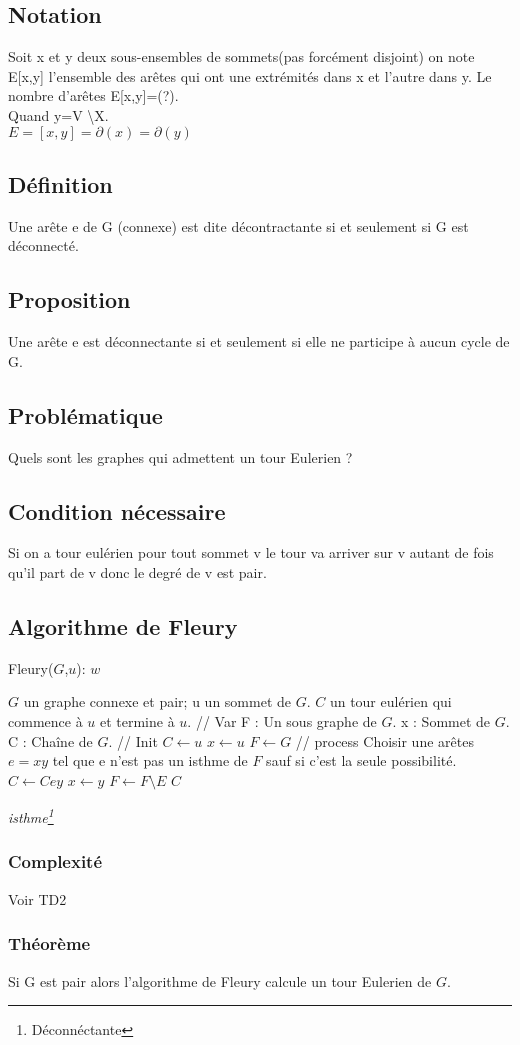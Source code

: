 \documentclass{article}
\begin{document}
\subsection*{Notation}
 Soit x et y deux sous-ensembles de sommets(pas forcément disjoint) on note E[x,y] l’ensemble des arêtes qui ont une extrémités dans x et l’autre dans y. Le nombre d’arêtes E[x,y]=(?). \\
Quand y=V \backslash X. \\
$E=[x,y]=\partial(x)=\partial(y)$ \\
\subsection*{Définition}
Une arête e de G (connexe) est dite décontractante si et seulement si G est déconnecté. 
\subsection*{Proposition}
Une arête e est déconnectante si et seulement si elle ne participe à aucun cycle de G.
\newpage
\subsection*{Problématique}
Quels sont les graphes qui admettent un tour Eulerien ?
\subsection*{Condition nécessaire}
Si on a tour eulérien pour tout sommet v le tour va arriver sur v autant de fois qu’il part de v donc le degré de v est pair. 
\subsection{Algorithme de Fleury}
\begin{algorithm}
\caption{Fleury($G$,$u$): $w$}
\begin{algorithmic}
\REQUIRE $G$ un graphe connexe et pair; u un sommet de $G$. 
\ENSURE $C$ un tour eulérien qui commence à $u$ et termine à $u$.
\STATE // Var
\STATE F : Un sous graphe de $G$. 
\STATE x : Sommet de $G$.
\STATE C : Chaîne de $G$.
\STATE // Init
\STATE $C \leftarrow u$
\STATE $x \leftarrow u$
\STATE $F \leftarrow G$
\STATE // process
\STATE Choisir une arêtes $e=xy$ tel que e n'est pas un isthme de $F$ sauf si c'est la seule possibilité.
\STATE $C \leftarrow Cey$
\STATE $x \leftarrow y$
\STATE $F \leftarrow F \setminus E$
\ENDWHILE
\RETURN $C$
\end{algorithmic}
\end{algorithm}
\emph{isthme\footnote{Déconnéctante}}
\subsubsection{Complexité}
Voir TD2 
\subsubsection{Théorème}
Si G est pair alors l’algorithme de Fleury calcule un tour Eulerien de $G$.
 
\end{document}
